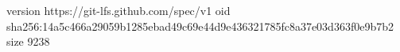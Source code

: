 version https://git-lfs.github.com/spec/v1
oid sha256:14a5c466a29059b1285ebad49c69e44d9e436321785fc8a37e03d363f0e9b7b2
size 9238
